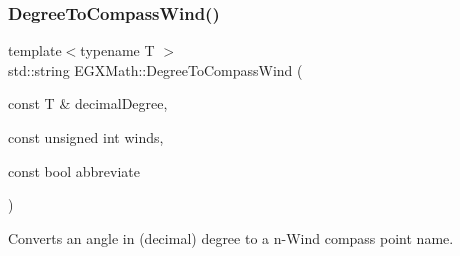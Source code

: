 \mbox{\label{group___e_g_x_math-_angle_conversions-_degree_ga5ffef873bcec300ab90570ad6e7b1ab1}} 
\subsubsection{\texorpdfstring{Degree\+To\+Compass\+Wind()}{DegreeToCompassWind()}}
{\footnotesize\ttfamily template$<$typename T $>$ \\
std\+::string E\+G\+X\+Math\+::\+Degree\+To\+Compass\+Wind (\begin{DoxyParamCaption}\item[{const T \&}]{decimal\+Degree,  }\item[{const unsigned int}]{winds,  }\item[{const bool}]{abbreviate }\end{DoxyParamCaption})}



Converts an angle in (decimal) degree to a n-\/\+Wind compass point name. 

